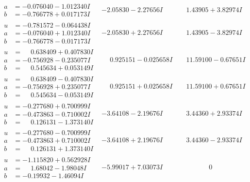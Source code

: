 \documentclass[1p]{elsarticle_modified}
\theoremstyle{definition}
\begin{document}
$$\begin{array}{c|c|c}
\begin{aligned}
a &= -0.076040 - 1.012340 I \\
b &= -0.766778 + 0.017173 I\end{aligned}
 & -2.05830 - 2.27656 I & \phantom{-}1.43905 + 3.82974 I \\ \hline\begin{aligned}
u &= -0.781572 - 0.064438 I \\
a &= -0.076040 + 1.012340 I \\
b &= -0.766778 - 0.017173 I\end{aligned}
 & -2.05830 + 2.27656 I & \phantom{-}1.43905 - 3.82974 I \\ \hline\begin{aligned}
u &= \phantom{-}0.638409 + 0.407830 I \\
a &= -0.756928 - 0.235077 I \\
b &= \phantom{-}0.545634 + 0.053149 I\end{aligned}
 & \phantom{-}0.925151 - 0.025658 I & \phantom{-}11.59100 - 0.67651 I \\ \hline\begin{aligned}
u &= \phantom{-}0.638409 - 0.407830 I \\
a &= -0.756928 + 0.235077 I \\
b &= \phantom{-}0.545634 - 0.053149 I\end{aligned}
 & \phantom{-}0.925151 + 0.025658 I & \phantom{-}11.59100 + 0.67651 I \\ \hline\begin{aligned}
u &= -0.277680 + 0.700999 I \\
a &= -0.473863 - 0.710002 I \\
b &= \phantom{-}0.126131 - 1.373140 I\end{aligned}
 & -3.64108 - 2.19676 I & \phantom{-}3.44360 + 2.93374 I \\ \hline\begin{aligned}
u &= -0.277680 - 0.700999 I \\
a &= -0.473863 + 0.710002 I \\
b &= \phantom{-}0.126131 + 1.373140 I\end{aligned}
 & -3.64108 + 2.19676 I & \phantom{-}3.44360 - 2.93374 I \\ \hline\begin{aligned}
u &= -1.115820 + 0.562928 I \\
a &= \phantom{-}1.68042 - 1.98048 I \\
b &= -0.19932 - 1.46094 I\end{aligned}
 & -5.99017 + 7.03073 I & \phantom{-0.000000 } 0 \\ \hline\begin{aligned}

\end{aligned}
\end{array}$$
\end{document}
